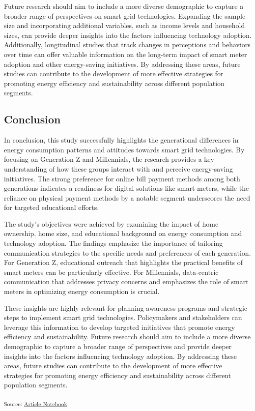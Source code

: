 \documentclass[
  letterpaper,
  DIV=11,
  numbers=noendperiod]{scrartcl}
\begin{document}
Future research should aim to include a more diverse demographic to
capture a broader range of perspectives on smart grid technologies.
Expanding the sample size and incorporating additional variables, such
as income levels and household sizes, can provide deeper insights into
the factors influencing technology adoption. Additionally, longitudinal
studies that track changes in perceptions and behaviors over time can
offer valuable information on the long-term impact of smart meter
adoption and other energy-saving initiatives. By addressing these areas,
future studies can contribute to the development of more effective
strategies for promoting energy efficiency and sustainability across
different population segments.

\subsection{Conclusion}\label{conclusion}

In conclusion, this study successfully highlights the generational
differences in energy consumption patterns and attitudes towards smart
grid technologies. By focusing on Generation Z and Millennials, the
research provides a key understanding of how these groups interact with
and perceive energy-saving initiatives. The strong preference for online
bill payment methods among both generations indicates a readiness for
digital solutions like smart meters, while the reliance on physical
payment methods by a notable segment underscores the need for targeted
educational efforts.

The study's objectives were achieved by examining the impact of home
ownership, home size, and educational background on energy consumption
and technology adoption. The findings emphasize the importance of
tailoring communication strategies to the specific needs and preferences
of each generation. For Generation Z, educational outreach that
highlights the practical benefits of smart meters can be particularly
effective. For Millennials, data-centric communication that addresses
privacy concerns and emphasizes the role of smart meters in optimizing
energy consumption is crucial.

These insights are highly relevant for planning awareness programs and
strategic steps to implement smart grid technologies. Policymakers and
stakeholders can leverage this information to develop targeted
initiatives that promote energy efficiency and sustainability. Future
research should aim to include a more diverse demographic to capture a
broader range of perspectives and provide deeper insights into the
factors influencing technology adoption. By addressing these areas,
future studies can contribute to the development of more effective
strategies for promoting energy efficiency and sustainability across
different population segments.

\textsubscript{Source:
\href{https://sijuswamyresearch.github.io/SM-project/index.qmd.html}{Article
Notebook}}
\end{document}
